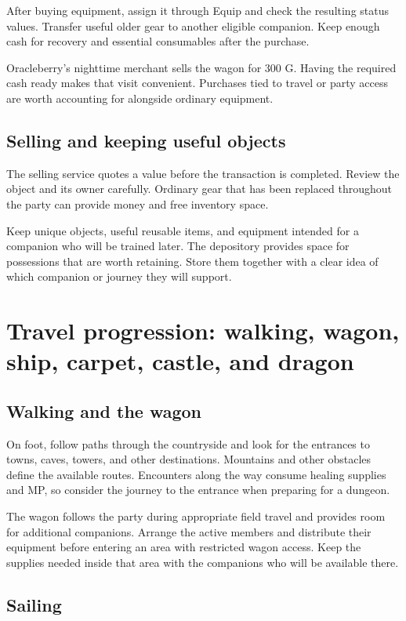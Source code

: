 After buying equipment, assign it through Equip and check the resulting
status values. Transfer useful older gear to another eligible companion.
Keep enough cash for recovery and essential consumables after the purchase.

Oracleberry's nighttime merchant sells the wagon for 300 G. Having the
required cash ready makes that visit convenient. Purchases tied to travel
or party access are worth accounting for alongside ordinary equipment.

\subsection*{Selling and keeping useful objects}

The selling service quotes a value before the transaction is completed.
Review the object and its owner carefully. Ordinary gear that has been
replaced throughout the party can provide money and free inventory space.

Keep unique objects, useful reusable items, and equipment intended for a
companion who will be trained later. The depository provides space for
possessions that are worth retaining. Store them together with a clear
idea of which companion or journey they will support.

\section{Travel progression: walking, wagon, ship, carpet, castle, and dragon}

\subsection*{Walking and the wagon}

On foot, follow paths through the countryside and look for the entrances
to towns, caves, towers, and other destinations. Mountains and other
obstacles define the available routes. Encounters along the way consume
healing supplies and MP, so consider the journey to the entrance when
preparing for a dungeon.

The wagon follows the party during appropriate field travel and provides
room for additional companions. Arrange the active members and distribute
their equipment before entering an area with restricted wagon access.
Keep the supplies needed inside that area with the companions who will
be available there.

\subsection*{Sailing}


